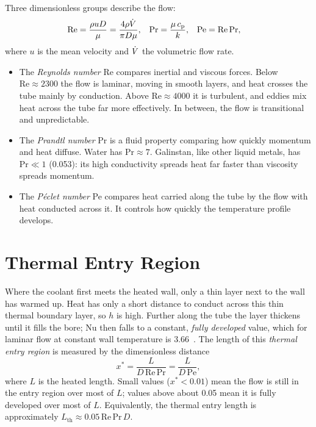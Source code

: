Three dimensionless groups describe the flow:
\begin{align}
  \mathrm{Re} &= \frac{\rho u D}{\mu} = \frac{4\rho\dot{V}}{\pi D \mu},
  & \mathrm{Pr} &= \frac{\mu\,c_{\mathrm{p}}}{k},
  & \mathrm{Pe} &= \mathrm{Re}\,\mathrm{Pr},
  \label{eq:app-groups}
\end{align}
where $u$ is the mean velocity and $\dot{V}$ the volumetric flow rate.
\begin{itemize}
  \item The \emph{Reynolds number} Re compares inertial and viscous forces. Below
    $\mathrm{Re} \approx 2300$ the flow is laminar, moving in smooth layers, and
    heat crosses the tube mainly by conduction. Above $\mathrm{Re} \approx 4000$
    it is turbulent, and eddies mix heat across the tube far more effectively. In
    between, the flow is transitional and unpredictable.
  \item The \emph{Prandtl number} Pr is a fluid property comparing how quickly
    momentum and heat diffuse. Water has $\mathrm{Pr} \approx 7$. Galinstan, like
    other liquid metals, has $\mathrm{Pr} \ll 1$ (0.053): its high conductivity
    spreads heat far faster than viscosity spreads momentum.
  \item The \emph{P\'eclet number} Pe compares heat carried along the tube by the
    flow with heat conducted across it. It controls how quickly the temperature
    profile develops.
\end{itemize}

\section{Thermal Entry Region}

Where the coolant first meets the heated wall, only a thin layer next to the
wall has warmed up. Heat has only a short distance to conduct across this thin
thermal boundary layer, so $h$ is high. Further along the tube the layer thickens
until it fills the bore; Nu then falls to a constant, \emph{fully developed}
value, which for laminar flow at constant wall temperature is
3.66~\cite{bergman_fundamentals_2017}. The length of this \emph{thermal entry
region} is measured by the dimensionless distance
\begin{equation}
  x^* = \frac{L}{D\,\mathrm{Re}\,\mathrm{Pr}} = \frac{L}{D\,\mathrm{Pe}},
  \label{eq:app-xstar}
\end{equation}
where $L$ is the heated length. Small values ($x^* < 0.01$) mean the flow
is still in the entry region over most of $L$; values above about 0.05 mean it is
fully developed over most of $L$. Equivalently, the thermal entry length is
approximately $L_{\mathrm{th}} \approx 0.05\,\mathrm{Re}\,\mathrm{Pr}\,D$.

